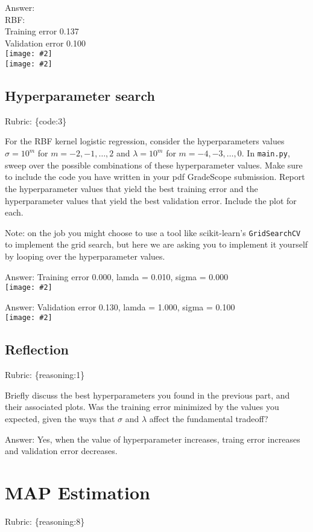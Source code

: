 \documentclass{article}
\def\rubric#1{\gre{Rubric: \{#1\}}}{}
\def\ans#1{\par\gre{Answer: #1}}
\def\blu#1{{\color{blu}#1}}
\def\gre#1{{\color{gre}#1}}
\newcommand{\fig}[2]{\texttt{[image: \#2]}}
\begin{document}
\ans{\\
	RBF: \\
	Training error 0.137\\
	Validation error 0.100\\
}
\fig{0.8}{../figs/logRegRBFKernel}\\
\fig{0.8}{../figs/1_1}


\subsection{Hyperparameter search}
\rubric{code:3}

For the RBF kernel logistic regression, consider the hyperparameters values $\sigma=10^m$ for $m=-2,-1,\ldots,2$ and $\lambda=10^m$ for $m=-4,-3,\ldots,0$. \blu{In \texttt{main.py}, sweep over the possible combinations of these hyperparameter values. Make sure to include the code you have written in your pdf GradeScope submission. Report the hyperparameter values that yield the best training error and the hyperparameter values that yield the best validation error. Include the plot for each.}

Note: on the job you might choose to use a tool like scikit-learn's \texttt{GridSearchCV} to implement the grid search, but here we are asking you to implement it yourself by looping over the hyperparameter values.

\ans{Training error 0.000, lamda = 0.010, sigma = 0.000}\\
\fig{0.8}{../figs/BestTraining}\\
\ans{Validation error 0.130, lamda = 1.000, sigma = 0.100}\\
\fig{0.8}{../figs/BestTesting}\\
\subsection{Reflection}
\rubric{reasoning:1}

Briefly discuss the best hyperparameters you found in the previous part, and their associated plots. Was the training error minimized by the values you expected, given the ways that $\sigma$ and $\lambda$ affect the fundamental tradeoff?

\ans{Yes, when the value of hyperparameter increases, traing error increases and validation error decreases.}

\section{MAP Estimation}
\rubric{reasoning:8}
\end{document}
